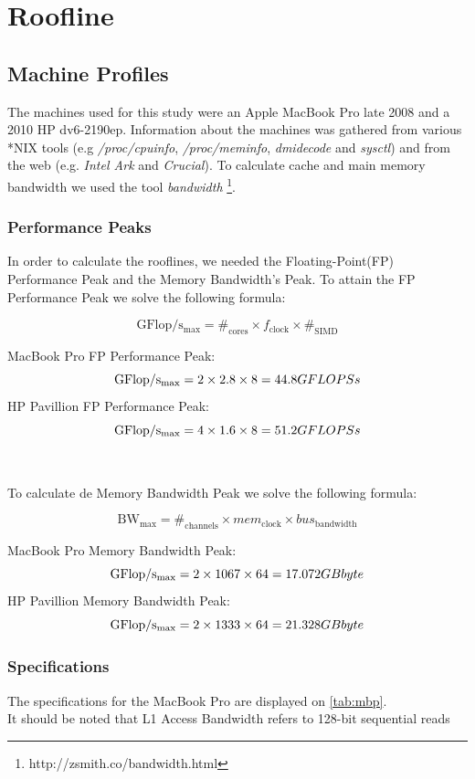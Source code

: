 \documentclass[a4paper,10pt,openright,openbib,twocolumn]{article}
\begin{document}
\section{Roofline}
\subsection{Machine Profiles}
The machines used for this study were an Apple MacBook Pro late 2008 and a 2010 HP dv6-2190ep.
Information about the machines was gathered from various *NIX tools (e.g \emph{/proc/cpuinfo}, \emph{/proc/meminfo}, \emph{dmidecode} and \emph{sysctl}) and from the web (e.g. \emph{Intel Ark} and \emph{Crucial}). To calculate cache and main memory bandwidth we used the tool \emph{bandwidth} \footnote{http://zsmith.co/bandwidth.html}.

\subsubsection{Performance Peaks}
In order to calculate the rooflines, we needed the Floating-Point(FP) Performance Peak and the Memory Bandwidth's Peak. 
To attain the FP Performance Peak we solve the following formula:

$$\mathrm{GFlop/s_{max}} =  \#_{\mathrm{cores}} \times f_{\mathrm{clock}} \times \#_{\mathrm{SIMD}}$$

MacBook Pro FP Performance Peak:
$$\mathrm{GFlop/s_{max}} =  2 \times 2.8 \times 8
						 =  44.8 GFLOPS\\s$$
HP Pavillion FP Performance Peak:
$$\mathrm{GFlop/s_{max}} =  4 \times 1.6 \times 8
						 =  51.2 GFLOPS\\s$$
\\
\\
To calculate de Memory Bandwidth Peak we solve the following formula:

$$\mathrm{BW_{max}} =  \#_{\mathrm{channels}} \times mem_{\mathrm{clock}} \times bus_{\mathrm{bandwidth}}$$
 
MacBook Pro Memory Bandwidth Peak:
$$\mathrm{GFlop/s_{max}} =  2 \times 1067 \times 64
						 =  17.072 GB\\byte$$
HP Pavillion Memory Bandwidth Peak:
$$\mathrm{GFlop/s_{max}} =  2 \times 1333 \times 64
						 =  21.328 GB\\byte$$

\subsubsection{Specifications}
The specifications for the MacBook Pro are displayed on \autoref{tab:mbp}. \\
\small{It should be noted that L1 Access Bandwidth refers to 128-bit sequential reads}\\
\end{document}
